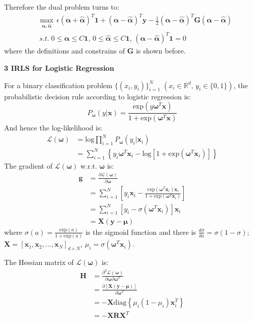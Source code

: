 \documentclass[12pt]{article}
\begin{document}
\par
Therefore the dual problem turns to:
\begin{align*}
&\max_{\bm{\alpha},\hat{\bm{\alpha}}}\,\epsilon\left(\bm{\alpha}+\hat{\bm{\alpha}}\right)^T\bm{1}+\left(\bm{\alpha}-\hat{\bm{\alpha}}\right)^T\bm{y}-\frac{1}{2}\left(\bm{\alpha}-\hat{\bm{\alpha}}\right)^T\bm{G}\left(\bm{\alpha}-\hat{\bm{\alpha}}\right)\\
&\,s.t.\;0\leq\bm{\alpha}\leq C\bm{1},\,0\leq\hat{\bm{\alpha}}\leq C\bm{1},\,\left(\bm{\alpha}-\hat{\bm{\alpha}}\right)^T\bm{1}=0
\end{align*}
where the definitions and constrains of $\bm{G}$ is shown before.

\bigskip
\bigskip
{\Large \bf 3 IRLS for Logistic Regression}
\par
\bigskip
For a binary classification problem $\{(x_i,y_i)\}_{i=1}^N\;(x_i\in\mathbb{R}^d,\,y_i\in\{0,1\})$, the probabilistic decision rule according to logistic regression is:
$$P_{\bm{\omega}}\left(y|\bm{x}\right)=\frac{\mathrm{exp}\left(y\bm{\omega}^T\bm{x}\right)}{1+\mathrm{exp}\left(\bm{\omega}^T\bm{x}\right)}$$
And hence the log-likelihood is:
\begin{align*}
\mathcal{L}\left(\bm{\omega}\right)&=\mathrm{log}\prod_{i=1}^N P_{\bm{\omega}}\left(y_i|\bm{x}_i\right)\\
&=\sum_{i=1}^N\left\{y_i\bm{\omega}^T\bm{x}_i-\mathrm{log}\left[1+\mathrm{exp}\left(\bm{\omega}^T\bm{x}_i\right)\right]\right\}
\end{align*}
The gradient of $\mathcal{L}\left(\bm{\omega}\right)$ w.r.t. $\bm{\omega}$ is:
\begin{align*}
\bm{g}&=\frac{\partial\mathcal{L}\left(\bm{\omega}\right)}{\partial\bm{\omega}}\\
&=\sum_{i=1}^N\left[y_i\bm{x}_i-\frac{\mathrm{exp}\left(\bm{\omega}^T\bm{x}_i\right)\bm{x}_i}{1+\mathrm{exp}\left(\bm{\omega}^T\bm{x}_i\right)}\right]\\
&=\sum_{i=1}^N\left[y_i-\sigma\left(\bm{\omega}^T\bm{x}_i\right)\right]\bm{x}_i\\
&=\bm{X}\left(\bm{y}-\bm{\mu}\right)
\end{align*}
where $\sigma(a)=\frac{\mathrm{exp}(a)}{1+\mathrm{exp}(a)}$ is the sigmoid function and there is $\frac{d\sigma}{da}=\sigma(1-\sigma)$; $\bm{X}=[\bm{x}_1,\bm{x}_2,...,\bm{x}_N]_{d\times N}$, $\mu_i=\sigma\left(\bm{\omega}^T\bm{x}_i\right)$.
\par
The Hessian matrix of $\mathcal{L}\left(\bm{\omega}\right)$ is:
\begin{align*}
\bm{H}&=\frac{\partial^2\mathcal{L}\left(\bm{\omega}\right)}{\partial\bm{\omega}\partial\bm{\omega}^T}\\
&=\frac{\partial\left[\bm{\bm{X}\left(\bm{y}-\bm{\mu}\right)}\right]}{\partial \bm{\omega}^T}\\
&=-\bm{X}\mathrm{diag}\left\{\mu_i\left(1-\mu_i\right)\bm{x}_i^T\right\}\\
&=-\bm{X}\bm{R}\bm{X}^T
\end{align*}
\end{document}
